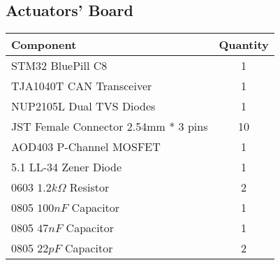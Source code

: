 \subsection{Actuators' Board}
\begin{center}
	\setlength\extrarowheight{7pt}
	\begin{tabular}{lc}
		{\large Component} & {\large Quantity} \\\midrule
		{\large STM32 BluePill C8} & {\large 1} \\
		{\large TJA1040T CAN Transceiver} & {\large 1} \\
		{\large NUP2105L Dual TVS Diodes} & {\large 1} \\ 
		{\large JST Female Connector 2.54mm * 3 pins} & {\large 10} \\
		{\large AOD403 P-Channel MOSFET} & {\large 1}\\
		{\large 5.1 LL-34 Zener Diode} & {\large 1} \\
		{\large 0603 $1.2 k\Omega$ Resistor}  & {\large 2}\\
		{\large 0805 $100 nF$ Capacitor}  & {\large 1}\\
		{\large 0805 $47 nF$ Capacitor}  & {\large 1}\\
		{\large 0805 $22 pF$ Capacitor}  & {\large 2}\\
	\end{tabular}
\end{center}

